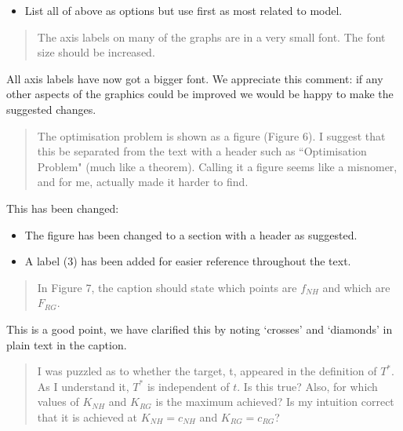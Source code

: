 \documentclass{article}
\begin{document}
\begin{itemize}
    \item List all of above as options but use first as most related to model.
\end{itemize}

\begin{quote}
    \begin{textit}
        {
        The axis labels on many of the graphs are in a very small font. The
        font size should be increased.
        }
    \end{textit}
\end{quote}

All axis labels have now got a bigger font. We appreciate this comment: if any
other aspects of the graphics could be improved we would be happy to make the
suggested changes.

\begin{quote}
    \begin{textit}
        {
        The optimisation problem is shown as a figure (Figure 6). I suggest
        that this be separated from the text with a header such as
        ``Optimisation Problem" (much like a theorem).  Calling it a figure
        seems like a misnomer, and for me, actually made it harder to find.
        }
    \end{textit}
\end{quote}

This has been changed:

\begin{itemize}
    \item The figure has been changed to a section with a header as suggested.
    \item A label (3) has been added for easier reference throughout the text.
\end{itemize}

\begin{quote}
    \begin{textit}
        {
            In Figure 7, the caption should state which points are \(f_{NH}\) and
            which are \(F_{RG}\).
        }
    \end{textit}
\end{quote}

This is a good point, we have clarified this by noting `crosses' and `diamonds' in plain text in the caption.

\begin{quote}
    \begin{textit}
        {
I was puzzled as to whether the target, t, appeared in the definition
of \(T^*\). As I understand it, \(T^*\) is independent of \(t\). Is this true?
Also, for which values of \(K_{NH}\) and \(K_{RG}\) is the maximum achieved? Is my
intuition correct that it is achieved at \(K_{NH} = c_{NH}\) and \(K_{RG} = c_{RG}\)?
        }
    \end{textit}
\end{quote}
\end{document}
